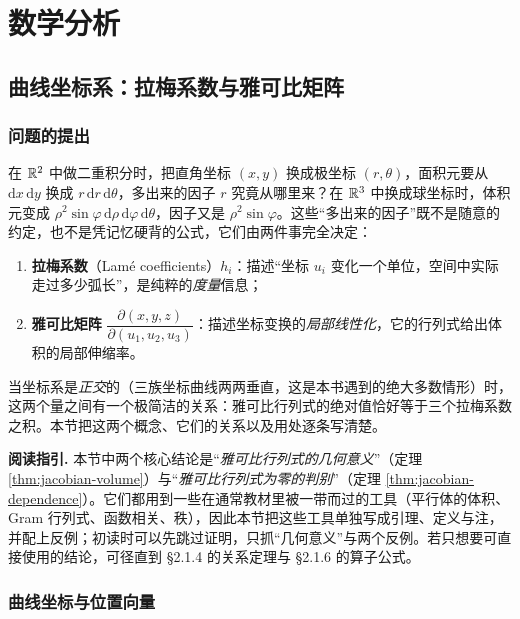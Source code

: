 \section{数学分析}

\subsection{曲线坐标系：拉梅系数与雅可比矩阵}

\subsubsection{问题的提出}

在 \(\mathbb{R}^2\) 中做二重积分时，把直角坐标 \((x,y)\) 换成极坐标 \((r,\theta)\)，面积元要从 \(\mathrm{d}x\,\mathrm{d}y\) 换成 \(r\,\mathrm{d}r\,\mathrm{d}\theta\)，多出来的因子 \(r\) 究竟从哪里来？在 \(\mathbb{R}^3\) 中换成球坐标时，体积元变成 \(\rho^2\sin\varphi\,\mathrm{d}\rho\,\mathrm{d}\varphi\,\mathrm{d}\theta\)，因子又是 \(\rho^2\sin\varphi\)。这些“多出来的因子”既不是随意的约定，也不是凭记忆硬背的公式，它们由两件事完全决定：

\begin{enumerate}[label=(\arabic*)]
  \item \textbf{拉梅系数}（Lamé coefficients）\(h_i\)：描述“坐标 \(u_i\) 变化一个单位，空间中实际走过多少弧长”，是纯粹的\emph{度量}信息；
  \item \textbf{雅可比矩阵} \(\dfrac{\partial(x,y,z)}{\partial(u_1,u_2,u_3)}\)：描述坐标变换的\emph{局部线性化}，它的行列式给出体积的局部伸缩率。
\end{enumerate}

当坐标系是\emph{正交}的（三族坐标曲线两两垂直，这是本书遇到的绝大多数情形）时，这两个量之间有一个极简洁的关系：雅可比行列式的绝对值恰好等于三个拉梅系数之积。本节把这两个概念、它们的关系以及用处逐条写清楚。

\noindent\textbf{阅读指引.} 本节中两个核心结论是“\emph{雅可比行列式的几何意义}”（定理 \ref{thm:jacobian-volume}）与“\emph{雅可比行列式为零的判别}”（定理 \ref{thm:jacobian-dependence}）。它们都用到一些在通常教材里被一带而过的工具（平行体的体积、Gram 行列式、函数相关、秩），因此本节把这些工具单独写成引理、定义与注，并配上反例；初读时可以先跳过证明，只抓“几何意义”与两个反例。若只想要可直接使用的结论，可径直到 \S2.1.4 的关系定理与 \S2.1.6 的算子公式。

\subsubsection{曲线坐标与位置向量}

